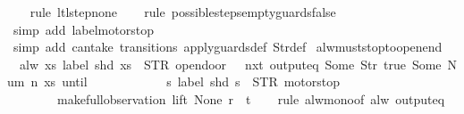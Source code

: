 \begin{isabellebody}
%
\isadelimproof
\ \ %
\endisadelimproof
%
\isatagproof
{}\isamarkupfalse%
\ {\isacharparenleft}rule\ ltl{\isacharunderscore}step{\isacharunderscore}none{\isacharparenright}\isanewline
\ \ \isamarkupfalse%
\ {\isacharparenleft}rule\ possible{\isacharunderscore}steps{\isacharunderscore}empty{\isacharunderscore}guards{\isacharunderscore}false{\isacharparenright}\isanewline
\ \ \isamarkupfalse%
\ {\isacharparenleft}simp\ add{\isacharcolon}\ label{\isacharunderscore}motorstop{\isacharparenright}\isanewline
\ \ \isamarkupfalse%
\ {\isacharparenleft}simp\ add{\isacharcolon}\ can{\isacharunderscore}take\ transitions\ apply{\isacharunderscore}guards{\isacharunderscore}def\ Str{\isacharunderscore}def{\isacharparenright}%
\endisatagproof
{\isafoldproof}%
%
\isadelimproof
\isanewline
%
\endisadelimproof
\isanewline
{}\isamarkupfalse%
\ alw{\isacharunderscore}must{\isacharunderscore}stop{\isacharunderscore}to{\isacharunderscore}open{\isacharunderscore}end{\isacharcolon}\isanewline
\ \ {\isachardoublequoteopen}alw\ {\isacharparenleft}{\isacharparenleft}{\isasymlambda}xs{\isachardot}\ label\ {\isacharparenleft}shd\ xs{\isacharparenright}\ {\isacharequal}\ STR\ {\isacharprime}{\isacharprime}opendoor{\isacharprime}{\isacharprime}\ {\isasymlongrightarrow}\ {\isasymnot}\ nxt\ {\isacharparenleft}output{\isacharunderscore}eq\ {\isacharbrackleft}Some\ {\isacharparenleft}Str\ {\isacharprime}{\isacharprime}true{\isacharprime}{\isacharprime}{\isacharparenright}{\isacharcomma}\ Some\ {\isacharparenleft}Num\ n{\isacharparenright}{\isacharbrackright}{\isacharparenright}\ xs{\isacharparenright}\ until\isanewline
\ \ \ \ \ \ \ \ \ \ \ \ {\isacharparenleft}{\isasymlambda}s{\isachardot}\ label\ {\isacharparenleft}shd\ s{\isacharparenright}\ {\isacharequal}\ STR\ {\isacharprime}{\isacharprime}motorstop{\isacharprime}{\isacharprime}{\isacharparenright}{\isacharparenright}\isanewline
\ \ \ \ \ \ \ \ {\isacharparenleft}make{\isacharunderscore}full{\isacharunderscore}observation\ lift\ None\ r\ {\isacharbrackleft}{\isacharbrackright}\ t{\isacharparenright}{\isachardoublequoteclose}\isanewline
%
\isadelimproof
\ \ %
\endisadelimproof
%
\isatagproof
{}\isamarkupfalse%
\ {\isacharparenleft}rule\ alw{\isacharunderscore}mono{\isacharbrackleft}of\ {\isachardoublequoteopen}alw\ {\isacharparenleft}output{\isacharunderscore}eq\ {\isacharbrackleft}{\isacharbrackright}{\isacharparenright}{\isachardoublequoteclose}{\isacharbrackright}{\isacharparenright}\isanewline
\ \ \ \isamarkupfalse%

\end{isabellebody}
